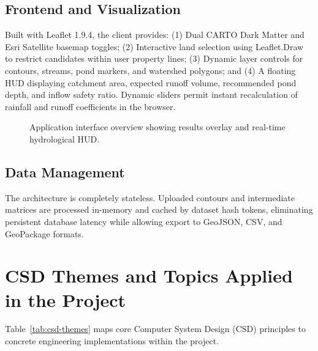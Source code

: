 \documentclass[manuscript,screen,review]{acmart}
\begin{document}
\subsection{Frontend and Visualization}
Built with Leaflet 1.9.4, the client provides:
(1) Dual CARTO Dark Matter and Esri Satellite basemap toggles;
(2) Interactive land selection using Leaflet.Draw to restrict candidates within user property lines;
(3) Dynamic layer controls for contours, streams, pond markers, and watershed polygons; and
(4) A floating HUD displaying catchment area, expected runoff volume, recommended pond depth, and inflow safety ratio. Dynamic sliders permit instant recalculation of rainfall and runoff coefficients in the browser.

\begin{figure}[h]
  \centering
  \caption{Application interface overview showing results overlay and real-time hydrological HUD.}
  \label{fig:ui}
\end{figure}

\subsection{Data Management}
The architecture is completely stateless. Uploaded contours and intermediate matrices are processed in-memory and cached by dataset hash tokens, eliminating persistent database latency while allowing export to GeoJSON, CSV, and GeoPackage formats.

\section{CSD Themes and Topics Applied in the Project}
\label{sec:csd-themes}
Table~\ref{tab:csd-themes} maps core Computer System Design (CSD) principles to concrete engineering implementations within the project.
\end{document}
